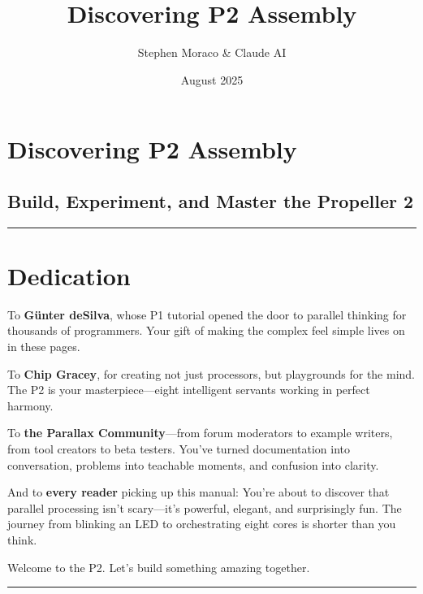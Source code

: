 \documentclass[11pt]{book}
\title{Discovering P2 Assembly}
\author{Stephen Moraco & Claude AI}
\date{August 2025}
\begin{document}
\maketitle

\tableofcontents
\clearpage

\hypertarget{discovering-p2-assembly}{%
\section{Discovering P2 Assembly}\label{discovering-p2-assembly}}

\hypertarget{build-experiment-and-master-the-propeller-2}{%
\subsection{Build, Experiment, and Master the Propeller
2}\label{build-experiment-and-master-the-propeller-2}}

\begin{center}\rule{0.5\linewidth}{0.5pt}\end{center}

\hypertarget{dedication}{%
\section{Dedication}\label{dedication}}

To \textbf{Günter deSilva}, whose P1 tutorial opened the door to
parallel thinking for thousands of programmers. Your gift of making the
complex feel simple lives on in these pages.

To \textbf{Chip Gracey}, for creating not just processors, but
playgrounds for the mind. The P2 is your masterpiece---eight intelligent
servants working in perfect harmony.

To \textbf{the Parallax Community}---from forum moderators to example
writers, from tool creators to beta testers. You've turned documentation
into conversation, problems into teachable moments, and confusion into
clarity.

And to \textbf{every reader} picking up this manual: You're about to
discover that parallel processing isn't scary---it's powerful, elegant,
and surprisingly fun. The journey from blinking an LED to orchestrating
eight cores is shorter than you think.

Welcome to the P2. Let's build something amazing together.

\begin{center}\rule{0.5\linewidth}{0.5pt}\end{center}
\end{document}
